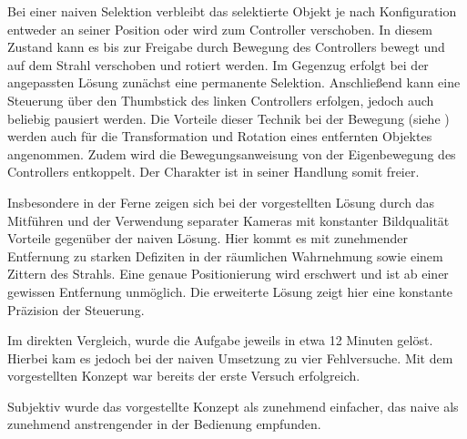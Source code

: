 \documentclass[25pt, a0paper, portrait, margin=0mm, innermargin=15mm,blockverticalspace=15mm, colspace=15mm, subcolspace=8mm, ngerman]{tikzposter}
\begin{document}
\begin{columns}
\begin{subcolumns}
{            Bei einer naiven Selektion verbleibt das selektierte Objekt je nach Konfiguration entweder an seiner Position oder wird zum Controller verschoben. In diesem Zustand kann es bis zur Freigabe durch Bewegung des Controllers bewegt und auf dem Strahl verschoben und rotiert werden. Im Gegenzug erfolgt bei der angepassten Lösung zunächst eine permanente Selektion. Anschließend kann eine Steuerung über den Thumbstick des linken Controllers erfolgen, jedoch auch beliebig pausiert werden. Die Vorteile dieser Technik bei der Bewegung (siehe  \cite{Locomotion}) werden auch für die Transformation und Rotation eines entfernten Objektes angenommen. Zudem wird die Bewegungsanweisung von der Eigenbewegung des Controllers entkoppelt. Der Charakter ist in seiner Handlung somit freier.
            
            \vspace{1em}
            
            Insbesondere in der Ferne zeigen sich bei der vorgestellten Lösung durch das Mitführen und der Verwendung separater Kameras mit konstanter Bildqualität Vorteile gegenüber der naiven Lösung. Hier kommt es mit zunehmender Entfernung zu starken Defiziten in der räumlichen Wahrnehmung sowie einem Zittern des Strahls. Eine genaue Positionierung wird erschwert und ist ab einer gewissen Entfernung unmöglich. Die erweiterte Lösung zeigt hier eine konstante Präzision der Steuerung. 
            
            \vspace{1em}
            
            Im direkten Vergleich, wurde die Aufgabe jeweils in etwa 12 Minuten gelöst. Hierbei kam es jedoch bei der naiven Umsetzung zu vier Fehlversuche. Mit dem vorgestellten Konzept war bereits der erste Versuch erfolgreich. 
            
            \vspace{1em}
            
            Subjektiv wurde das vorgestellte Konzept als zunehmend einfacher, das naive als zunehmend anstrengender in der Bedienung empfunden. 
        }


    \end{subcolumns}
    

        \block{}{
            \vspace{-6cm}
            \printbibliography
        }
        
\end{columns}
\end{document}
